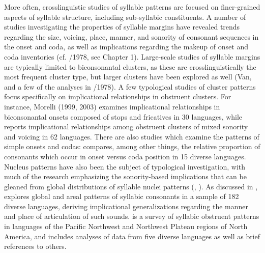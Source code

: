   More often, crosslinguistic studies of syllable patterns are focused on finer-grained aspects of syllable structure, including sub-syllabic constituents. A number of studies investigating the properties of syllable margins have revealed trends regarding the size, voicing, place, manner, and sonority of consonant sequences in the onset and coda, as well as implications regarding the makeup of onset and coda inventories (cf. \citealt{Greenberg1965}/1978, see Chapter 1). Large-scale studies of syllable margins are typically limited to biconsonantal clusters, as these are crosslinguistically the most frequent cluster type, but larger clusters have been explored as well (Van\citealt{Dam2004}, and a few of the analyses in \citealt{Greenberg1965}/1978). A few typological studies of cluster patterns focus specifically on implicational relationships in obstruent clusters. For instance, Morelli (1999, 2003) examines implicational relationships in biconsonantal onsets composed of stops and fricatives in 30 languages, while \citet{Kreitman2008} reports implicational relationships among obstruent clusters of mixed sonority and voicing in 62 languages. There are also studies which examine the patterns of simple onsets and codas: \citet{Rousset2004} compares, among other things, the relative proportion of consonants which occur in onset versus coda position in 15 diverse languages. Nucleus patterns have also been the subject of typological investigation, with much of the research emphasizing the sonority-based implications that can be gleaned from global distributions of syllable nuclei patterns (\citealt{Blevins1995}, \citealt{Zec2007}). As discussed in , \citet{Bell1978a} explores global and areal patterns of syllabic consonants in a sample of 182 diverse languages, deriving implicational generalizations regarding the manner and place of articulation of such sounds. \citet{Hoard1978} is a survey of syllabic obstruent patterns in languages of the Pacific Northwest and Northwest Plateau regions of North America, and includes analyses of data from five diverse languages as well as brief references to others.




